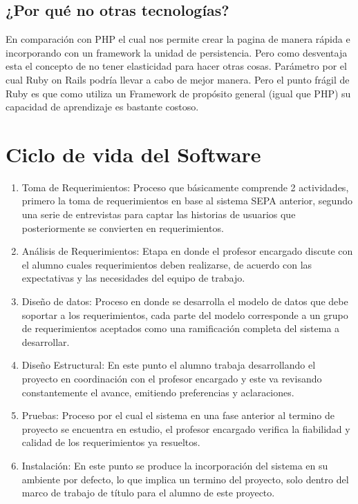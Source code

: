 \documentclass[a4paper,12pt,openany,oneside]{book}
\begin{document}
\subsection{¿Por qué no otras tecnologías?}
En comparación con PHP el cual nos permite crear la pagina de manera rápida e incorporando con un framework la unidad de persistencia. Pero como desventaja esta el concepto de no tener elasticidad para hacer otras cosas. Parámetro por el cual Ruby on Rails podría llevar a cabo de mejor manera. Pero el punto frágil de Ruby es que como utiliza un Framework de propósito general (igual que PHP) su capacidad de aprendizaje es bastante costoso.

\section{Ciclo de vida del Software}
\begin{enumerate}
\item Toma de Requerimientos: Proceso que básicamente comprende 2 actividades, primero la toma de requerimientos en base al sistema SEPA anterior, segundo una serie de entrevistas para captar las historias de usuarios que posteriormente se convierten en requerimientos.
\item Análisis de Requerimientos: Etapa en donde el profesor encargado discute con el alumno cuales requerimientos deben realizarse, de acuerdo con las expectativas y las necesidades del equipo de trabajo.
\item Diseño de datos: Proceso en donde se desarrolla el modelo de datos que debe soportar a los requerimientos, cada parte del modelo corresponde a un grupo de requerimientos aceptados como una ramificación completa del sistema a desarrollar.
\item Diseño Estructural: En este punto el alumno trabaja desarrollando el proyecto en coordinación con el profesor encargado y este va revisando constantemente el avance, emitiendo preferencias y aclaraciones.
\item Pruebas: Proceso por el cual el sistema en una fase anterior al termino de proyecto se encuentra en estudio, el profesor encargado verifica la fiabilidad y calidad de los requerimientos ya resueltos.
\item Instalación: En este punto se produce la incorporación del sistema en su ambiente por defecto, lo que implica un termino del proyecto, solo dentro del marco de trabajo de título para el alumno de este proyecto.
\end{enumerate}
\end{document}
